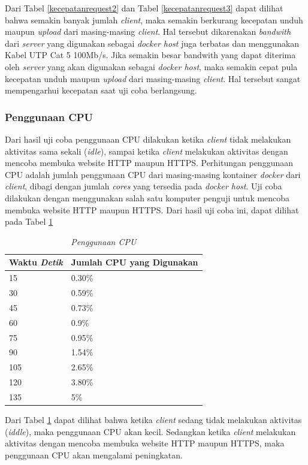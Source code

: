 Dari Tabel \ref{kecepatanrequest2} dan Tabel \ref{kecepatanrequest3} dapat dilihat bahwa semakin banyak jumlah \textit{client}, maka semakin berkurang kecepatan unduh maupun \textit{upload} dari masing-masing \textit{client}. Hal tersebut dikarenakan \textit{bandwith} dari \textit{server} yang digunakan sebagai \textit{docker host} juga terbatas dan menggunakan Kabel UTP Cat 5 100Mb/s. Jika semakin besar bandwith yang dapat diterima oleh \textit{server} yang akan digunakan sebagai \textit{docker host}, maka semakin cepat pula kecepatan unduh maupun \textit{upload} dari masing-masing \textit{client}. Hal tersebut sangat mempengarhui kecepatan saat uji coba berlangsung.

\subsubsection{Penggunaan CPU}
Dari hasil uji coba penggunaan CPU dilakukan ketika \textit{client} tidak melakukan aktivitas sama sekali (\textit{idle}), sampai ketika \textit{client} melakukan aktivitas dengan mencoba membuka website HTTP maupun HTTPS. Perhitungan penggunaan CPU adalah jumlah penggunaan CPU dari masing-masing kontainer \textit{docker} dari \textit{client}, dibagi dengan jumlah \textit{cores} yang tersedia pada \textit{docker host}. Uji coba dilakukan dengan menggunakan salah satu komputer penguji untuk mencoba membuka website HTTP maupun HTTPS. Dari hasil uji coba ini, dapat dilihat pada Tabel \ref{penggunaancpu}
\newline
\newline
\newline
\newline
\newline
\newline
\begin{longtable}{|p{}|p{}|}
	\caption{\textit{Penggunaan CPU}} \label{penggunaancpu} \\
	\hline
	\textbf{Waktu \textit{Detik}} & \textbf{Jumlah CPU yang Digunakan} \\ \hline
	\endfirsthead
	
	\endhead
	\endfoot
	\endlastfoot
	
	15 & 0.30\% \\ \hline
	30 & 0.59\% \\ \hline
	45 & 0.73\% \\ \hline
	60 & 0.9\% \\ \hline
	75 & 0.95\% \\ \hline
	90 & 1.54\% \\ \hline
	105 & 2.65\% \\ \hline
	120 & 3.80\% \\ \hline
	135 & 5\% \\ \hline
\end{longtable}
Dari Tabel \ref{penggunaancpu} dapat dilihat bahwa ketika \textit{client} sedang tidak melakukan aktivitas (\textit{iddle}), maka penggunaan CPU akan kecil. Sedangkan ketika \textit{client} melakukan aktivitas dengan mencoba membuka website HTTP maupun HTTPS, maka penggunaan CPU akan mengalami peningkatan. 

